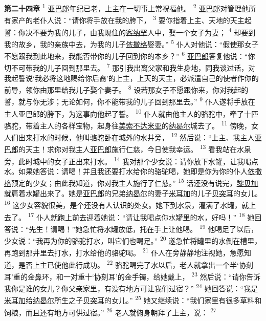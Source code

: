 \textbf{第二十四章\quad}
\textsuperscript{1}
\uline{亚巴郎}年纪已老，上主在一切事上常祝福他。
\textsuperscript{2}
\uline{亚巴郎}对管理他所有家产的老仆人说：“请你将手放在我的胯下，
\textsuperscript{3}
要你指着上主、天地的天主起誓：你决不要为我的儿子，由我现住的\uline{客纳罕}人中，娶一个女子为妻；
\textsuperscript{4}
却要到我的故乡，我的亲族中去，为我的儿子\uline{依撒格}娶妻。”
\textsuperscript{5}
仆人对他说：“假使那女子不愿跟我到此地来，我能否带你的儿子回到你的本乡？”
\textsuperscript{6}
\uline{亚巴郎}答复他说：“你切不可带我的儿子回到那里去。
\textsuperscript{7}
那引我出离父家和我生身地，同我谈过话，对我起誓说‘我必将这地赐给你后裔’的上主，上天的天主，必派遣自己的使者作你的前导，领你由那里给我儿子娶个妻子。
\textsuperscript{8}
设若那女子不愿跟你来，你对我起的誓，就与你无涉；无论如何，你不能带我的儿子回到那里去。”
\textsuperscript{9}
仆人遂将手放在主人\uline{亚巴郎}的胯下，为这事向他起了誓。
\textsuperscript{10}
仆人就由他主人的骆驼中，牵了十匹骆驼，带着主人的各样宝物，起身往\uline{美索不}\uline{达米亚}的\uline{纳曷尔}城去了。
\textsuperscript{11}
傍晚，女人们出来打水的时候，他叫骆驼卧在城外的水井旁，
\textsuperscript{12}
然后说：“上主、我主人\uline{亚巴郎}的天主！求你对我主人\uline{亚巴郎}施行仁慈，今日使我幸运。
\textsuperscript{13}
看我站在水泉旁，此时城中的女子正出来打水。
\textsuperscript{14}
我对那个少女说：请你放下水罐，让我喝点水。如果她答说：请喝！并且我还要打水给你的骆驼喝，她即是你为你的仆人\uline{依撒格}预定的少女；由此我知道，你对我主人施行了仁慈。”
\textsuperscript{15}
话还没有说完，\uline{黎贝加}就肩着水罐出来了。她是\uline{亚巴郎}的兄弟\uline{纳曷尔}的妻子\uline{米耳加}的儿子\uline{贝突耳}的女儿。
\textsuperscript{16}
这少女容貌很美，是个还没有人认识的处女。她下到水泉，灌满了水罐，就上去了。
\textsuperscript{17}
仆人就跑上前去迎着她说：“请让我喝点你水罐里的水，好吗！”
\textsuperscript{18}
她回答说：“先生！请喝！”她急忙将水罐放低，托在手上让他喝。
\textsuperscript{19}
他喝足了以后，少女说：“我再为你的骆驼打水，叫它们也喝足。”
\textsuperscript{20}
遂急忙将罐里的水倒在槽里，再跑到那井里去打水，打水给他的骆驼喝。
\textsuperscript{21}
仆人在旁静静地注视她，急愿知道，是否上主已使他此行成功。
\textsuperscript{22}
骆驼喝完了水以后，老人就拿出一个半‘协刻耳’重的金鼻环，和一对重十‘协刻耳’的金手镯，给她戴上，
\textsuperscript{23}
然后说：“请你告诉我你是谁的女儿？你父亲家里，有没有地方可让我们过宿？”
\textsuperscript{24}
她回答说：“我是\uline{米耳加}给\uline{纳曷尔}所生之子\uline{贝突耳}的女儿。”
\textsuperscript{25}
她又继续说：“我们家里有很多草料和饲粮，而且还有地方可供过宿。”
\textsuperscript{26}
老人就俯身朝拜了上主，说：
\textsuperscript{27}
